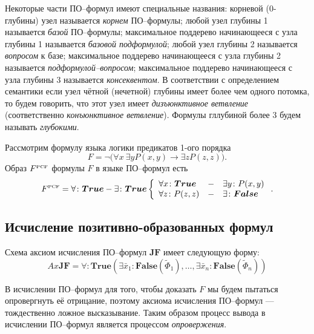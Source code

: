 
Некоторые части ПО--формул имеют специальные названия: корневой (0-глубины) узел называется {\em корнем} ПО--формулы; любой узел глубины 1 называется {\em базой} ПО--формулы; максимальное поддерево начинающееся с узла глубины 1 называется {\em базовой подформулой}; любой узел глубины 2 называется {\em вопросом} к базе; максимальное поддерево начинающееся с узла глубины 2 называется {\em подформулой--вопросом}; максимальное поддерево начинающееся с узла глубины 3 называется {\em консеквентом}. В соответствии с определением семантики если узел чётной (нечетной) глубины имеет более чем одного потомка, то будем говорить, что этот узел имеет {\em дизъюнктивное ветвление} (соответственно {\em конъюнктивное ветвление}). Формулы гллубиной более 3 будем называть {\em глубокими}.

\begin{example}
Рассмотрим формулу языка логики предикатов 1-ого порядка
$$F= \neg\bigl(\forall x\:\exists y P(x,y)\rightarrow \exists z P(z,z)\bigr).$$
Образ $F^{\text{\tiny{PCF}}}$ формулы $F$ в языке ПО--формул есть
$$F^{\text{\tiny{PCF}}} = \forall\colon \boldsymbol{True}-\exists\colon\boldsymbol{True} \left\{
\begin{array}{lcl}
 \forall x\colon\boldsymbol{True} & - & \exists y\colon P(x,y) \\
 \forall z\colon P(z,z) & - & \exists\colon\boldsymbol{False}
\end{array}
\right..$$

\end{example}


\subsection{Исчисление позитивно-образованных формул}

Схема аксиом исчисления ПО--формул $\boldsymbol{JF}$ имеет следующую форму:
$$ Ax\boldsymbol{JF} = \forall\colon\boldsymbol{True}\left(\exists \bar{x}_1\colon\boldsymbol{False}\left(\widetilde{\Phi}_1\right),\ldots,\exists \bar{x}_n\colon\boldsymbol{False}\left(\widetilde{\Phi}_n\right)\right) $$

В исчислении ПО--формул для того, чтобы доказать $F$ мы будем пытаться опровергнуть её отрицание, поэтому аксиома исчисления ПО--формул ---  тождественно ложное высказывание. Таким образом процесс вывода в исчислении ПО--формул является процессом {\em опровержения}.

